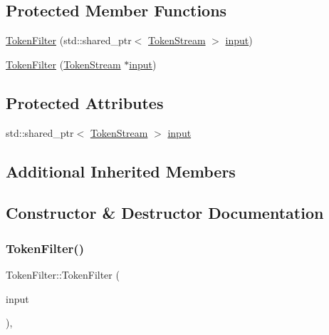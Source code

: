 \subsection*{Protected Member Functions}
\begin{DoxyCompactItemize}
\item 
\mbox{\hyperlink{classlucene_1_1core_1_1analysis_1_1TokenFilter_af8da6113c95735e58b01f86c42506a17}{Token\+Filter}} (std\+::shared\+\_\+ptr$<$ \mbox{\hyperlink{classlucene_1_1core_1_1analysis_1_1TokenStream}{Token\+Stream}} $>$ \mbox{\hyperlink{classlucene_1_1core_1_1analysis_1_1TokenFilter_aa7b4bf19056c271e00b91a46f2f37504}{input}})
\item 
\mbox{\hyperlink{classlucene_1_1core_1_1analysis_1_1TokenFilter_a0cb8d29a47c80ee2626f8f970d66e4c5}{Token\+Filter}} (\mbox{\hyperlink{classlucene_1_1core_1_1analysis_1_1TokenStream}{Token\+Stream}} $\ast$\mbox{\hyperlink{classlucene_1_1core_1_1analysis_1_1TokenFilter_aa7b4bf19056c271e00b91a46f2f37504}{input}})
\end{DoxyCompactItemize}
\subsection*{Protected Attributes}
\begin{DoxyCompactItemize}
\item 
std\+::shared\+\_\+ptr$<$ \mbox{\hyperlink{classlucene_1_1core_1_1analysis_1_1TokenStream}{Token\+Stream}} $>$ \mbox{\hyperlink{classlucene_1_1core_1_1analysis_1_1TokenFilter_aa7b4bf19056c271e00b91a46f2f37504}{input}}
\end{DoxyCompactItemize}
\subsection*{Additional Inherited Members}


\subsection{Constructor \& Destructor Documentation}
\mbox{\label{classlucene_1_1core_1_1analysis_1_1TokenFilter_af8da6113c95735e58b01f86c42506a17}} 
\subsubsection{\texorpdfstring{Token\+Filter()}{TokenFilter()}\hspace{0.1cm}{\footnotesize\ttfamily [1/2]}}
{\footnotesize\ttfamily Token\+Filter\+::\+Token\+Filter (\begin{DoxyParamCaption}\item[{std\+::shared\+\_\+ptr$<$ \mbox{\hyperlink{classlucene_1_1core_1_1analysis_1_1TokenStream}{Token\+Stream}} $>$}]{input }\end{DoxyParamCaption})\hspace{0.3cm}{\ttfamily [explicit]}, {\ttfamily [protected]}}

